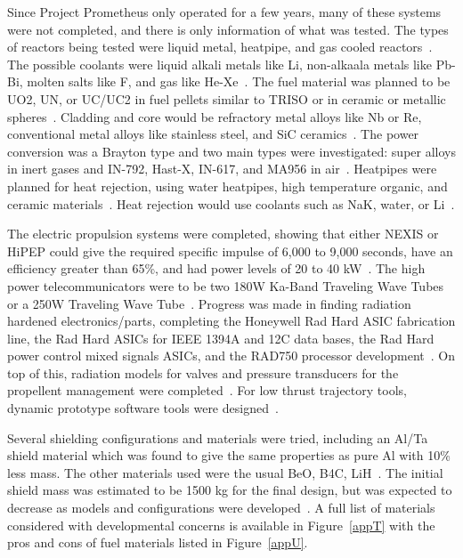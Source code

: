 \documentclass{article}
\begin{document}
Since Project Prometheus only operated for a few years, many of these systems were not completed, and there is only information of what was tested. The types of reactors being tested were liquid metal, heatpipe, and gas cooled reactors~\cite{wollman2006prometheus}. The possible coolants were liquid alkali metals like Li, non-alkaala metals like Pb-Bi, molten salts like F, and gas like He-Xe~\cite{wollman2006prometheus}. The fuel material was planned to be UO2, UN, or UC/UC2 in fuel pellets similar to TRISO or in ceramic or metallic spheres~\cite{wollman2006prometheus}. Cladding and core would be refractory metal alloys like Nb or Re, conventional metal alloys like stainless steel, and SiC ceramics~\cite{wollman2006prometheus}. The power conversion was a Brayton type and two main types were investigated: super alloys in inert gases and IN-792, Hast-X, IN-617, and MA956 in air~\cite{taylor2005prometheus}. Heatpipes were planned for heat rejection, using water heatpipes, high temperature organic, and ceramic materials~\cite{taylor2005prometheus}. Heat rejection would use coolants such as NaK, water, or Li~\cite{wollman2006prometheus}.


The electric propulsion systems were completed, showing that either NEXIS or HiPEP could give the required specific impulse of 6,000 to 9,000 seconds, have an efficiency greater than 65\%, and had power levels of 20 to 40 kW~\cite{taylor2005prometheus}. The high power telecommunicators were to be two 180W Ka-Band Traveling Wave Tubes or a 250W Traveling Wave Tube~\cite{taylor2005prometheus}. Progress was made in finding radiation hardened electronics/parts, completing the Honeywell Rad Hard ASIC fabrication line, the Rad Hard ASICs for IEEE 1394A and 12C data bases, the Rad Hard power control mixed signals ASICs, and the RAD750 processor development~\cite{taylor2005prometheus}. On top of this, radiation models for valves and pressure transducers for the propellent management were completed~\cite{taylor2005prometheus}. For low thrust trajectory tools, dynamic prototype software tools were designed~\cite{taylor2005prometheus}.


Several shielding configurations and materials were tried, including an Al/Ta shield material which was found to give the same properties as pure Al with 10\% less mass. The other materials used were the usual BeO, B4C, LiH~\cite{wollman2006prometheus}. The initial shield mass was estimated to be 1500 kg for the final design, but was expected to decrease as models and configurations were developed~\cite{taylor2005prometheus}. A full list of materials considered with developmental concerns is available in Figure~\ref{appT} with the pros and cons of fuel materials listed in Figure~\ref{appU}. 
\end{document}
